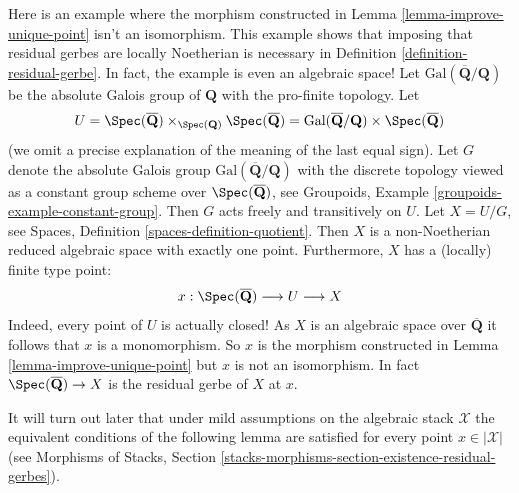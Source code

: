 \begin{example}
\label{example-distinct}
Here is an example where the morphism constructed in
Lemma \ref{lemma-improve-unique-point}
isn't an isomorphism. This example shows that imposing
that residual gerbes are locally Noetherian is necessary in
Definition \ref{definition-residual-gerbe}.
In fact, the example is even an algebraic space!
Let $\text{Gal}(\overline{\mathbf{Q}}/\mathbf{Q})$ be the absolute
Galois group of $\mathbf{Q}$ with the pro-finite topology.
Let
$$
U =
\Spec(\overline{\mathbf{Q}})
\times_{\Spec(\mathbf{Q})}
\Spec(\overline{\mathbf{Q}}) =
\text{Gal}(\overline{\mathbf{Q}}/\mathbf{Q}) \times
\Spec(\overline{\mathbf{Q}})
$$
(we omit a precise explanation of the meaning of the last equal sign).
Let $G$ denote the absolute Galois group
$\text{Gal}(\overline{\mathbf{Q}}/\mathbf{Q})$ with the discrete
topology viewed as a constant group scheme over
$\Spec(\overline{\mathbf{Q}})$, see
Groupoids, Example \ref{groupoids-example-constant-group}.
Then $G$ acts freely and transitively on $U$.
Let $X = U/G$, see
Spaces, Definition \ref{spaces-definition-quotient}.
Then $X$ is a non-Noetherian reduced algebraic space with exactly one point.
Furthermore, $X$ has a (locally) finite type point:
$$
x :
\Spec(\overline{\mathbf{Q}}) \longrightarrow
U \longrightarrow X
$$
Indeed, every point of $U$ is actually closed!
As $X$ is an algebraic space over $\overline{\mathbf{Q}}$
it follows that $x$ is a monomorphism. So $x$ is the morphism
constructed in
Lemma \ref{lemma-improve-unique-point}
but $x$ is not an isomorphism. In fact
$\Spec(\overline{\mathbf{Q}}) \to X$ is the residual gerbe of $X$ at $x$.
\end{example}

\noindent
It will turn out later that under mild assumptions on the algebraic stack
$\mathcal{X}$ the equivalent conditions of the following lemma are satisfied
for every point $x \in |\mathcal{X}|$ (see Morphisms of Stacks, Section
\ref{stacks-morphisms-section-existence-residual-gerbes}).

